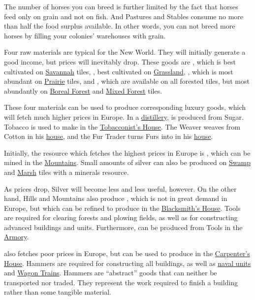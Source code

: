 \documentclass[12pt]{book}
\begin{document}
The number of horses you can breed is further limited by the fact that
horses feed only on grain and not on fish. And Pastures and Stables
consume no more than half the food surplus available. In other words,
you can not breed more horses by filling your colonies' warehouses
with grain.

Four raw materials are typical for the New World. They will initially
generate a good income, but prices will inevitably drop. These goods
are , which is best cultivated on
\hyperlink{Savannah}{Savannah} tiles, , best cultivated
on \hyperlink{Grassland}{Grassland}, , which is most
abundant on \hyperlink{Prairie}{Prairie} tiles, and ,
which are available on all forested tiles, but most abundantly on
\hyperlink{Boreal Forest}{Boreal Forest} and \hyperlink{Mixed
Forest}{Mixed Forest} tiles.

These four materials can be used to produce corresponding luxury
goods, which will fetch much higher prices in Europe. In a
\hyperlink{Distiller's House}{distillery},  is produced
from Sugar. Tobacco is used to make  in the
\hyperlink{Tobacconist's House}{Tobacconist's House}. The Weaver
weaves  from Cotton in his \hyperlink{Weaver's
House}{house}, and the Fur Trader turns Furs into  in his
\hyperlink{Fur Trader's House}{house}.

Initially, the resource which fetches the highest prices in Europe is
, which can be mined in the
\hyperlink{Mountains}{Mountains}. Small amounts of silver can also be
produced on \hyperlink{Swamp}{Swamp} and \hyperlink{Marsh}{Marsh}
tiles with a minerals resource.

As prices drop, Silver will become less and less useful, however. On
the other hand, Hills and Mountains also produce , which is
not in great demand in Europe, but which can be refined to produce
 in the \hyperlink{Blacksmith's House}{Blacksmith's
  House}. Tools are required for clearing forests and plowing fields,
as well as for constructing advanced buildings and units. Furthermore,
 can be produced from Tools in the
\hyperlink{Armory}{Armory}.

 also fetches poor prices in Europe, but can be used to
produce  in the \hyperlink{Carpenter's
House}{Carpenter's House}. Hammers are required for constructing all
buildings, as well as \hyperlink{Naval Units}{naval units} and
\hyperlink{Wagon Train}{Wagon Trains}. Hammers are ``abstract'' goods
that can neither be transported nor traded. They represent the work
required to finish a building rather than some tangible material.
\end{document}
